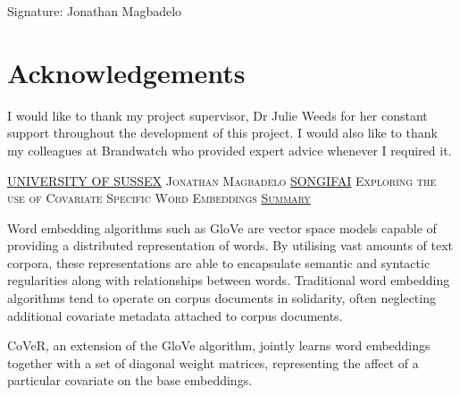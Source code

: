 \documentclass[a4paper,11pt]{report}
\newcommand{\linespacing}{1.5}
\renewcommand{\baselinestretch}{\linespacing}
\begin{document}

\vskip5mm
Signature:
\vskip20mm
Jonathan Magbadelo

\chapter*{Acknowledgements}
\renewcommand{\baselinestretch}{\linespacing}
\small\normalsize
I would like to thank my project supervisor, Dr Julie Weeds for her constant support throughout the development of this project. I would also like to thank my colleagues at Brandwatch who provided expert advice whenever I required it.

\thispagestyle{empty}
\newpage
\null\vskip10mm
\begin{center}
\large
\underline{UNIVERSITY OF SUSSEX}
\vskip20mm
\textsc{Jonathan Magbadelo}
\vskip20mm
\underline{\textsc{SONGIFAI}}
\vskip0mm
\textsc{Exploring the use of Covariate Specific Word Embeddings}
\vskip15mm
\underline{\textsc{Summary}}
\vskip2mm
\end{center}
\renewcommand{\baselinestretch}{1.0}
\small\normalsize
Word embedding algorithms such as GloVe are vector space models capable of providing a distributed representation of words. By utilising vast amounts of text corpora, these representations are able to encapsulate semantic and syntactic regularities along with relationships between words. Traditional word embedding algorithms tend to operate on corpus documents in solidarity, often neglecting additional covariate metadata attached to corpus documents. 

\noindent
\newline
CoVeR, an extension of the GloVe algorithm, jointly learns word embeddings together with a set of diagonal weight matrices, representing the affect of a particular covariate on the base embeddings.
\end{document}
